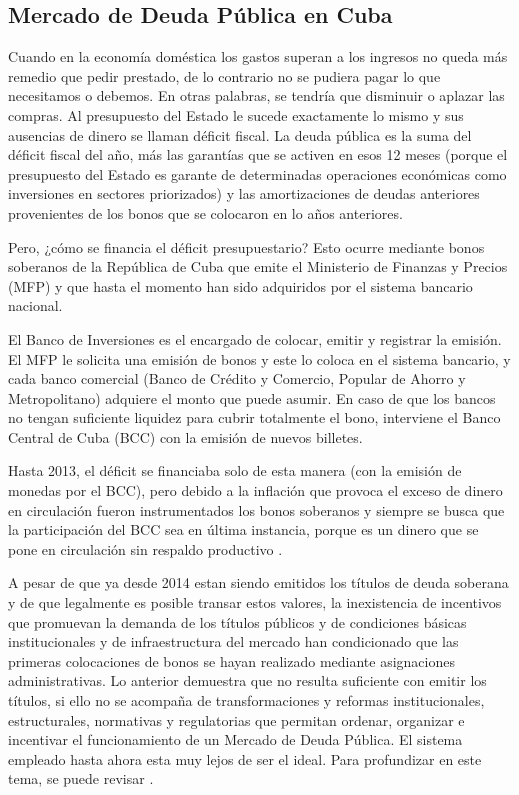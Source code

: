   \subsection{Mercado de Deuda Pública en Cuba} \hspace*{}

    Cuando en la economía doméstica los gastos superan a los ingresos no queda más remedio que pedir prestado, de lo contrario 
    no se pudiera pagar lo que necesitamos o debemos. En otras palabras, se tendría que disminuir o aplazar las compras. Al presupuesto del 
    Estado le sucede exactamente lo mismo y sus ausencias de dinero se llaman déficit fiscal. La deuda pública es la suma del déficit 
    fiscal del año, más las garantías que se activen en esos 12 meses (porque el presupuesto del Estado es garante de determinadas 
    operaciones económicas como inversiones en sectores priorizados) y las amortizaciones de deudas anteriores provenientes de los bonos 
    que se colocaron en lo años anteriores.

    Pero, ¿cómo se financia el déficit presupuestario? Esto ocurre mediante bonos soberanos de la República de 
    Cuba que emite el Ministerio de Finanzas y Precios (MFP) y que hasta el momento han sido adquiridos por el sistema bancario nacional.

    El Banco de Inversiones es el encargado de colocar, emitir y registrar la emisión. El MFP le solicita una emisión de bonos y este lo 
    coloca en el sistema bancario, y cada banco comercial (Banco de Crédito y Comercio, Popular de Ahorro y Metropolitano) adquiere el 
    monto que puede asumir. En caso de que los bancos no tengan suficiente liquidez para cubrir totalmente el bono, interviene el Banco 
    Central de Cuba (BCC) con la emisión de nuevos billetes.

    Hasta 2013, el déficit se financiaba solo de esta manera (con la emisión de monedas por el BCC), pero debido a la inflación que 
    provoca el exceso de dinero en circulación fueron instrumentados los bonos soberanos y siempre se busca que la participación del 
    BCC sea en última instancia, porque es un dinero que se pone en circulación sin respaldo productivo \parencite{carmona2021}. 

    A pesar de que ya desde 2014 estan siendo emitidos los títulos de deuda soberana y de que legalmente es posible transar estos valores, 
    la inexistencia de incentivos que promuevan la demanda de los títulos públicos y de condiciones básicas institucionales y de
    infraestructura del mercado han condicionado que las primeras colocaciones de bonos se hayan realizado mediante asignaciones 
    administrativas. Lo anterior demuestra que no resulta suficiente con emitir los títulos, si ello no se acompaña de transformaciones y
    reformas institucionales, estructurales, normativas y regulatorias que permitan ordenar,
    organizar e incentivar el funcionamiento de un Mercado de Deuda Pública. El sistema empleado hasta ahora
    esta muy lejos de ser el ideal. Para profundizar en este tema, se puede revisar \parencite{barcelo2017}.

